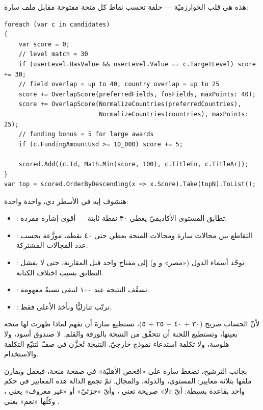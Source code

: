 هذه هي قلب الخوارزميّة — حلقة تحسب نقاط كل منحة مفتوحة مقابل ملف سارة:

\begin{english}
\begin{lstlisting}[language={[Sharp]C}]
foreach (var c in candidates)
{
    var score = 0;
    // level match = 30
    if (userLevel.HasValue && userLevel.Value == c.TargetLevel) score += 30;
    // field overlap = up to 40, country overlap = up to 25
    score += OverlapScore(preferredFields, fosFields, maxPoints: 40);
    score += OverlapScore(NormalizeCountries(preferredCountries),
                          NormalizeCountries(countries), maxPoints: 25);
    // funding bonus = 5 for large awards
    if (c.FundingAmountUsd >= 10_000) score += 5;

    scored.Add((c.Id, Math.Min(score, 100), c.TitleEn, c.TitleAr));
}
var top = scored.OrderByDescending(x => x.Score).Take(topN).ToList();
\end{lstlisting}
\end{english}

هنشوف إيه في الأسطر دي، واحدة واحدة:
\begin{itemize}
\item {}: تطابق المستوى الأكاديميّ
يعطي ٣٠ نقطة ثابتة — أقوى إشارة مفردة.
\item {}: التقاطع بين مجالات سارة ومجالات
المنحة يعطي حتى ٤٠ نقطة، موزَّعة بحسب عدد المجالات المشتركة.
\item {}: نوحّد أسماء الدول («مصر» و و)
إلى مفتاح واحد قبل المقارنة، حتى لا يفشل التطابق بسبب اختلاف الكتابة.
\item {}: نسقُف النتيجة عند ١٠٠ لتبقى نسبةً مفهومة.
\item {}: نرتّب تنازليًّا ونأخذ الأعلى فقط.
\end{itemize}

\begin{idea}
لأنّ الحساب صريح (٣٠ + ٤٠ + ٢٥ + ٥)، تستطيع سارة أن تفهم لماذا ظهرت لها منحة بعينها،
وتستطيع اللجنة أن تتحقّق من النتيجة بالورقة والقلم. لا صندوق أسود، ولا هلوسة، ولا
تكلفة استدعاء نموذج خارجيّ. النتيجة تُخزَّن في صفّ  لتتبّع التكلفة
والاستخدام.
\end{idea}

بجانب الترشيح، تضغط سارة على «افحص الأهليّة» في صفحة منحة، فيعمل
 ويقارن  ملفها بثلاثة معايير:
المستوى، والدولة، والمجال. ثمّ تجمع الدالة  هذه المعايير في حكم
واحد بقاعدة بسيطة: أيّ «لا» صريحة تعني ، وأيّ «جزئيّ» أو «غير معروف»
يعني ، وكلّها «نعم» يعني .

